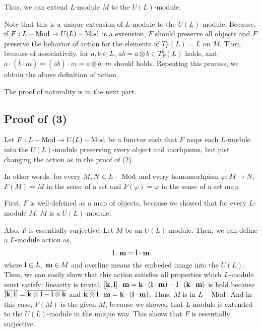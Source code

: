 Thus, we can extend \(L\)-module \(M\) to the \(U(L)\)-module.

Note that this is a unique extension of \(L\)-module to the \(U(L)\)-module.
Because, if \(F: L-\textnormal{Mod} \to U(L)-\textnormal{Mod}\) is a extension,
\(F\) should preserve all objects
and \(F\) preserve the behavior of action for the elements of
\(T_F^1(L) = L\) on \(M\).
Then, because of associativity,
for \(a, b \in L\),
\(\overline{a} \overline{b} = \overline{a \otimes b} \in T_F^2(L)\) holds,
and \(\overline{a} \cdot (\overline{b} \cdot m) = (\overline{a} \overline{b}) \cdot m = \overline{a \otimes b} \cdot m\)
should holds.
Repeating this process, we obtain the above definition of action.

The proof of naturality is in the next part.

\subsection*{Proof of (3)}

Let \(F: L-\textnormal{Mod} \to U(L)-\textnormal{Mod}\) be a functor
such that \(F\) maps each \(L\)-module into the \(U(L)\)-module
preserving every object and morhpisms,
but just changing the action as in the proof of (2).

In other words,
for every \(M, N \in L-\textnormal{Mod}\)
and every homomorhpism \(\varphi: M \to N\),
\(F(M) = M\) in the sense of a set
and
\(F(\varphi) = \varphi\)
in the sense of a set map.

First, \(F\) is well-defeined as a map of objects,
because we showed that for every \(L\)-module \(M\),
\(M\) is a \(U(L)\)-module.

Also, \(F\) is essentially surjective.
Let \(M\) be an \(U(L)\)-module.
Then, we can define a \(L\)-module action as,
\[\mathbf{l} \cdot \mathbf{m} = \overline{\mathbf{l}} \cdot \mathbf{m}\]
where \(\mathbf{l} \in L\), \(\mathbf{m} \in M\) and overline means the embeded image into the \(U(L)\).
Then, we can easily show that this action satisfies all properties which 
\(L\)-module must satisfy:
linearity is trivial,
\([\mathbf{k}, \mathbf{l}] \cdot \mathbf{m} = \mathbf{k} \cdot (\mathbf{l} \cdot \mathbf{m}) - \mathbf{l} \cdot (\mathbf{k} \cdot \mathbf{m})\) is hold because
\(\overline{[\mathbf{k}, \mathbf{l}]} = \overline{\mathbf{k} \otimes \mathbf{l} - \mathbf{l} \otimes \mathbf{k}}\)
and \(\overline{\mathbf{k} \otimes \mathbf{l}} \cdot \mathbf{m} = \mathbf{k} \cdot (\mathbf{l} \cdot \mathbf{m})\).
Thus, \(M\) is in \(L-\textnormal{Mod}\).
And in this case, \(F(M)\) is the given \(M\), because we showed that
\(L\)-module is extended to the \(U(L)\)-module in the unique way.
This shows that \(F\) is essentially surjective.


